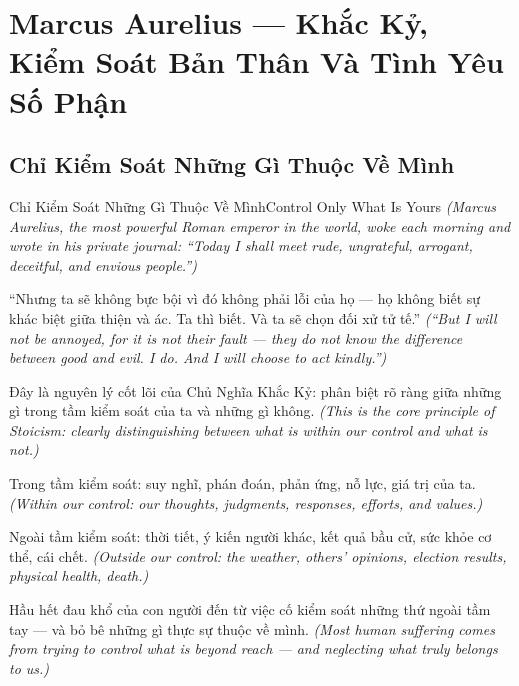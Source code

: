 \chapter{Marcus Aurelius — Khắc Kỷ, Kiểm Soát Bản Thân Và Tình Yêu Số Phận}

\section{Chỉ Kiểm Soát Những Gì Thuộc Về Mình}
\begin{truyen}{Chỉ Kiểm Soát Những Gì Thuộc Về Mình}{Control Only What Is Yours}
\textit{(Marcus Aurelius, the most powerful Roman emperor in the world, woke each morning and wrote in his private journal: ``Today I shall meet rude, ungrateful, arrogant, deceitful, and envious people.'')}

``Nhưng ta sẽ không bực bội vì đó không phải lỗi của họ — họ không biết sự khác biệt giữa thiện và ác. Ta thì biết. Và ta sẽ chọn đối xử tử tế.''
\textit{(``But I will not be annoyed, for it is not their fault — they do not know the difference between good and evil. I do. And I will choose to act kindly.'')}

Đây là nguyên lý cốt lõi của Chủ Nghĩa Khắc Kỷ: phân biệt rõ ràng giữa những gì trong tầm kiểm soát của ta và những gì không.
\textit{(This is the core principle of Stoicism: clearly distinguishing between what is within our control and what is not.)}

Trong tầm kiểm soát: suy nghĩ, phán đoán, phản ứng, nỗ lực, giá trị của ta.
\textit{(Within our control: our thoughts, judgments, responses, efforts, and values.)}

Ngoài tầm kiểm soát: thời tiết, ý kiến người khác, kết quả bầu cử, sức khỏe cơ thể, cái chết.
\textit{(Outside our control: the weather, others' opinions, election results, physical health, death.)}

Hầu hết đau khổ của con người đến từ việc cố kiểm soát những thứ ngoài tầm tay — và bỏ bê những gì thực sự thuộc về mình.
\textit{(Most human suffering comes from trying to control what is beyond reach — and neglecting what truly belongs to us.)}

\end{truyen}

